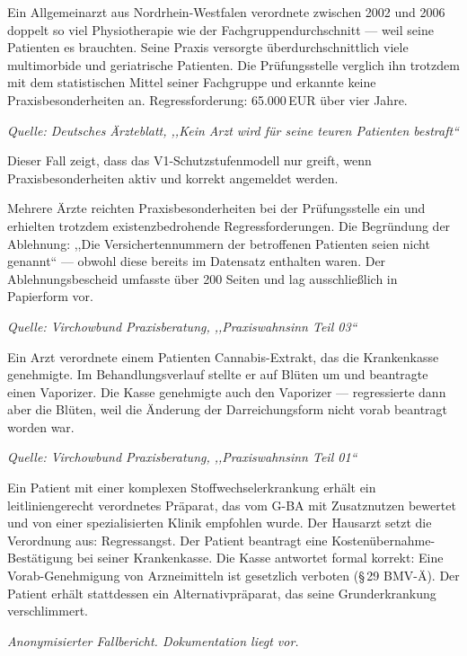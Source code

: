 \documentclass{umbruch-position}
\begin{document}
\begin{infobox}
Ein Allgemeinarzt aus Nordrhein-Westfalen verordnete zwischen 2002 und 2006 doppelt so viel Physiotherapie wie der Fachgruppendurchschnitt — weil seine Patienten es brauchten. Seine Praxis versorgte überdurchschnittlich viele multimorbide und geriatrische Patienten. Die Prüfungsstelle verglich ihn trotzdem mit dem statistischen Mittel seiner Fachgruppe und erkannte keine Praxisbesonderheiten an. Regressforderung: 65.000\,EUR über vier Jahre.

\textit{Quelle: Deutsches Ärzteblatt, ,,Kein Arzt wird für seine teuren Patienten bestraft``}

Dieser Fall zeigt, dass das V1-Schutzstufenmodell nur greift, wenn Praxisbesonderheiten aktiv und korrekt angemeldet werden.
\end{infobox}

\begin{infobox}
Mehrere Ärzte reichten Praxisbesonderheiten bei der Prüfungsstelle ein und erhielten trotzdem existenzbedrohende Regressforderungen. Die Begründung der Ablehnung: ,,Die Versichertennummern der betroffenen Patienten seien nicht genannt`` — obwohl diese bereits im Datensatz enthalten waren. Der Ablehnungsbescheid umfasste über 200 Seiten und lag ausschließlich in Papierform vor.

\textit{Quelle: Virchowbund Praxisberatung, ,,Praxiswahnsinn Teil 03``}
\end{infobox}

\begin{infobox}
Ein Arzt verordnete einem Patienten Cannabis-Extrakt, das die Krankenkasse genehmigte. Im Behandlungsverlauf stellte er auf Blüten um und beantragte einen Vaporizer. Die Kasse genehmigte auch den Vaporizer — regressierte dann aber die Blüten, weil die Änderung der Darreichungsform nicht vorab beantragt worden war.

\textit{Quelle: Virchowbund Praxisberatung, ,,Praxiswahnsinn Teil 01``}
\end{infobox}

\begin{infobox}
Ein Patient mit einer komplexen Stoffwechselerkrankung erhält ein leitliniengerecht verordnetes Präparat, das vom G-BA mit Zusatznutzen bewertet und von einer spezialisierten Klinik empfohlen wurde. Der Hausarzt setzt die Verordnung aus: Regressangst. Der Patient beantragt eine Kostenübernahme-Bestätigung bei seiner Krankenkasse. Die Kasse antwortet formal korrekt: Eine Vorab-Genehmigung von Arzneimitteln ist gesetzlich verboten (\S\,29 BMV-Ä). Der Patient erhält stattdessen ein Alternativpräparat, das seine Grunderkrankung verschlimmert.

\textit{Anonymisierter Fallbericht. Dokumentation liegt vor.}
\end{infobox}
\end{document}
